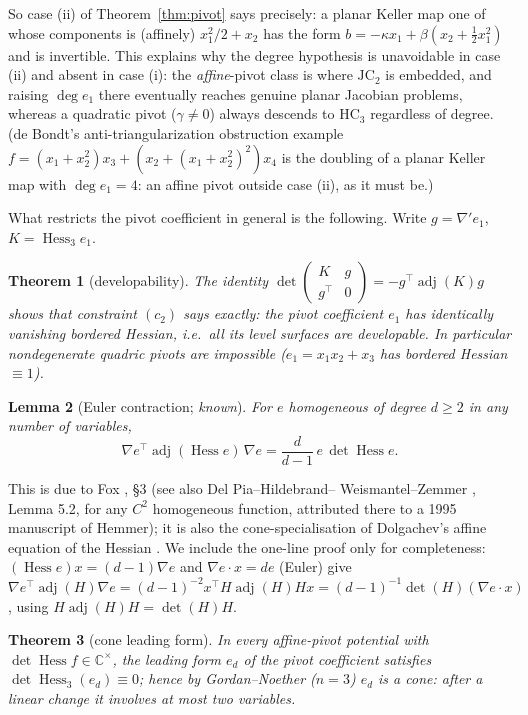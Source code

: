 \documentclass[11pt]{article}
\theoremstyle{plain}
\newtheorem{theorem}{Theorem}[section]
\newtheorem{lemma}[theorem]{Lemma}
\theoremstyle{definition}
\newcommand{\C}{\mathbb{C}}
\newcommand{\Hess}{\operatorname{Hess}}
\newcommand{\adj}{\operatorname{adj}}
\newcommand{\HC}{\mathrm{HC}}
\newcommand{\JC}{\mathrm{JC}}
\begin{document}
So case (ii) of Theorem~\ref{thm:pivot} says precisely: a planar Keller map
one of whose components is (affinely) $x_1^2/2+x_2$ has the form
$b=-\kappa x_1+\beta(x_2+\tfrac12x_1^2)$ and is invertible. This explains
why the degree hypothesis is unavoidable in case (ii) and absent in case
(i): the \emph{affine}-pivot class is where $\JC_2$ is embedded, and
raising $\deg e_1$ there eventually reaches genuine planar Jacobian
problems, whereas a quadratic pivot ($\gamma\ne0$) always descends to
$\HC_3$ regardless of degree. (de Bondt's anti-triangularization
obstruction example $f=(x_1+x_2^2)x_3+(x_2+(x_1+x_2^2)^2)x_4$ is the
doubling of a planar Keller map with $\deg e_1=4$: an affine pivot outside
case (ii), as it must be.)

What restricts the pivot coefficient in general is the following. Write
$g=\nabla'e_1$, $K=\Hess_3e_1$.

\begin{theorem}[developability]\label{thm:dev}
The identity $\det\left(\begin{smallmatrix}K&g\\g^\top&0\end{smallmatrix}
\right)=-g^\top\adj(K)g$ shows that constraint $(c_2)$ says exactly: the
pivot coefficient $e_1$ has identically vanishing bordered Hessian, i.e.\
all its level surfaces are developable. In particular nondegenerate
quadric pivots are impossible ($e_1=x_1x_2+x_3$ has bordered Hessian
$\equiv1$).
\end{theorem}

\begin{lemma}[Euler contraction; \emph{known}]\label{lem:euler}
For $e$ homogeneous of degree $d\ge2$ in any number of variables,
\[
\nabla e^\top\adj(\Hess e)\,\nabla e=\frac{d}{d-1}\,e\,\det\Hess e .
\]
\end{lemma}

This is due to Fox \cite{Fox2017}, \S3 (see also Del Pia--Hildebrand--%
Weismantel--Zemmer \cite{DHWZ}, Lemma 5.2, for any $C^2$ homogeneous
function, attributed there to a 1995 manuscript of Hemmer); it is also the
cone-specialisation of Dolgachev's affine equation of the Hessian
\cite[(1.20)]{Dolgachev}. We include the one-line proof only for
completeness: $(\Hess e)x=(d-1)\nabla e$ and $\nabla e\cdot x=de$ (Euler)
give $\nabla e^\top\adj(H)\nabla e=(d-1)^{-2}x^\top H\adj(H)Hx
=(d-1)^{-1}\det(H)(\nabla e\cdot x)$, using $H\adj(H)H=\det(H)H$.

\begin{theorem}[cone leading form]\label{thm:cone}
In every affine-pivot potential with $\det\Hess f\in\C^\times$, the
leading form $e_d$ of the pivot coefficient satisfies
$\det\Hess_3(e_d)\equiv0$; hence by Gordan--Noether ($n=3$) $e_d$ is a
\emph{cone}: after a linear change it involves at most two variables.
\end{theorem}
\end{document}
